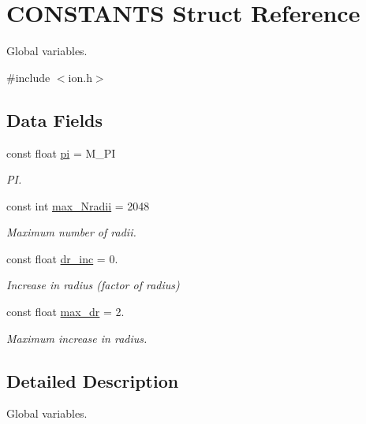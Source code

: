 \hypertarget{struct_c_o_n_s_t_a_n_t_s}{\section{C\+O\+N\+S\+T\+A\+N\+T\+S Struct Reference}
\label{struct_c_o_n_s_t_a_n_t_s}
}


Global variables.  




{\ttfamily \#include $<$ion.\+h$>$}

\subsection*{Data Fields}
\begin{DoxyCompactItemize}
\item 
const float \hyperlink{struct_c_o_n_s_t_a_n_t_s_abce8f0db8a5282e441988c8d2e73f79e}{pi} = M\+\_\+\+P\+I
\begin{DoxyCompactList}\small\item\em P\+I. \end{DoxyCompactList}\item 
const int \hyperlink{struct_c_o_n_s_t_a_n_t_s_afe3adcf3ff974c278558c412f9ba9aaa}{max\+\_\+\+Nradii} = 2048
\begin{DoxyCompactList}\small\item\em Maximum number of radii. \end{DoxyCompactList}\item 
const float \hyperlink{struct_c_o_n_s_t_a_n_t_s_aee74bf2783f87d610cfb7a42933cb3a3}{dr\+\_\+inc} = 0.
\begin{DoxyCompactList}\small\item\em Increase in radius (factor of radius) \end{DoxyCompactList}\item 
const float \hyperlink{struct_c_o_n_s_t_a_n_t_s_a5ddc9828f90dc883b9baf3dfab1cd3e6}{max\+\_\+dr} = 2.
\begin{DoxyCompactList}\small\item\em Maximum increase in radius. \end{DoxyCompactList}\end{DoxyCompactItemize}


\subsection{Detailed Description}
Global variables. 

